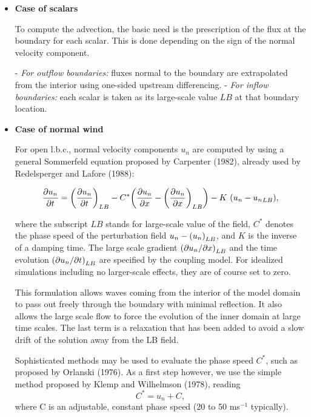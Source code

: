 \begin{itemize}
\item {\bf Case of scalars}

To compute the advection, the basic need is the prescription of the flux
at the boundary for each scalar. This is done depending
on the sign of the normal velocity component.

\subitem - {\it For outflow boundaries:} fluxes normal to the boundary are
extrapolated from the interior using one-sided upstream differencing.
\subitem - {\it For inflow boundaries:}  each scalar is taken as its
large-scale value $LB$ at that boundary location.

\item {\bf Case of normal wind}

For open l.b.c., normal velocity components $u_n$ are computed by using a
general Sommerfeld equation proposed by Carpenter (1982), already used by
Redelsperger and Lafore (1988):


\begin{equation}
\label{carpenter}
{\partial u_n \over \partial t} =             {\left({{\partial u_n \over \partial t}}\right)}_{LB}
- C^*{\left(  {\partial u_n \over \partial x}  -  {\left({{\partial u_n \over \partial x}}\right)}_{LB}  \right)}
- K \, \, {\left( u_n - {u_n}_{LB}   \right)},
\end{equation}

\noindent
 where the subscript $LB$ stands for large-scale value of the field,
$C^*$ denotes the phase speed of the perturbation field
$u_n - {\left({u_n}\right)}_{LB}$, and $K$ is the inverse of a damping time.
The large scale gradient
${\left( {\partial u_n} / {\partial x} \right)}_{LB}$ and the time evolution
${\left( {\partial u_n} / {\partial t} \right)}_{LB}$ are specified by the coupling model.
For idealized simulations including no larger-scale effects, they are of
course set to zero.

This formulation allows waves coming from the interior of the model domain
to pass out freely through the boundary with minimal reflection. It also
allows the large scale flow to force the evolution of the inner domain at
large time scales. The last term is a relaxation that has been added to
avoid a slow drift of the solution away from the LB field.

Sophisticated methods may be used to evaluate the phase speed $C^*$,
such as proposed by Orlanski (1976). As a first step however,
we use the simple method proposed by Klemp and Wilhelmson (1978), reading
\begin{equation}
C^*= u_n + C,
\end{equation}
\noindent
where C is an adjustable, constant phase speed (20 to 50 ms$^{-1}$ typically).



\end{itemize}
